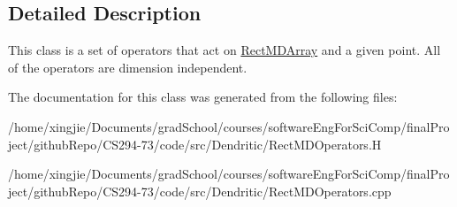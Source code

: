 \subsection{Detailed Description}
This class is a set of operators that act on \hyperlink{classRectMDArray}{Rect\+M\+D\+Array} and a given point. All of the operators are dimension independent. 

The documentation for this class was generated from the following files\+:\begin{DoxyCompactItemize}
\item 
/home/xingjie/\+Documents/grad\+School/courses/software\+Eng\+For\+Sci\+Comp/final\+Project/github\+Repo/\+C\+S294-\/73/code/src/\+Dendritic/Rect\+M\+D\+Operators.\+H\item 
/home/xingjie/\+Documents/grad\+School/courses/software\+Eng\+For\+Sci\+Comp/final\+Project/github\+Repo/\+C\+S294-\/73/code/src/\+Dendritic/Rect\+M\+D\+Operators.\+cpp\end{DoxyCompactItemize}
